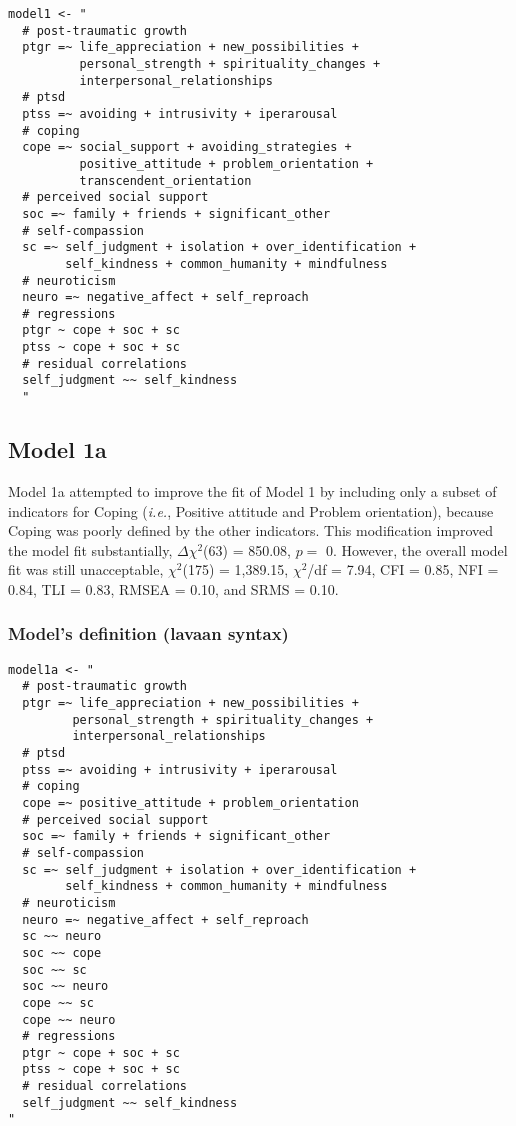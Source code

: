 \documentclass[aps,floatfix,prl]{revtex4}
\begin{document}
\begin{verbatim}
model1 <- "
  # post-traumatic growth
  ptgr =~ life_appreciation + new_possibilities + 
          personal_strength + spirituality_changes + 
          interpersonal_relationships
  # ptsd
  ptss =~ avoiding + intrusivity + iperarousal
  # coping
  cope =~ social_support + avoiding_strategies + 
          positive_attitude + problem_orientation + 
          transcendent_orientation
  # perceived social support
  soc =~ family + friends + significant_other
  # self-compassion
  sc =~ self_judgment + isolation + over_identification +
        self_kindness + common_humanity + mindfulness
  # neuroticism
  neuro =~ negative_affect + self_reproach
  # regressions
  ptgr ~ cope + soc + sc 
  ptss ~ cope + soc + sc 
  # residual correlations
  self_judgment ~~ self_kindness
  "
\end{verbatim}

\newpage

\hypertarget{model-1a}{%
\subsection{Model 1a}\label{model-1a}}

Model 1a attempted to improve the fit of Model 1 by including only a
subset of indicators for Coping (\emph{i.e.}, Positive attitude and
Problem orientation), because Coping was poorly defined by the other
indicators. This modification improved the model fit substantially,
\(\Delta \chi^2\)(63) = 850.08, \(p =\) 0. However, the overall model
fit was still unacceptable, \(\chi^2\)(175) = 1,389.15, \(\chi^2\)/df =
7.94, CFI = 0.85, NFI = 0.84, TLI = 0.83, RMSEA = 0.10, and SRMS = 0.10.

\hypertarget{models-definition-lavaan-syntax-2}{%
\subsubsection{Model's definition (lavaan
syntax)}\label{models-definition-lavaan-syntax-2}}

\begin{verbatim}
model1a <- "
  # post-traumatic growth
  ptgr =~ life_appreciation + new_possibilities + 
         personal_strength + spirituality_changes + 
         interpersonal_relationships
  # ptsd
  ptss =~ avoiding + intrusivity + iperarousal
  # coping
  cope =~ positive_attitude + problem_orientation 
  # perceived social support
  soc =~ family + friends + significant_other
  # self-compassion
  sc =~ self_judgment + isolation + over_identification +
        self_kindness + common_humanity + mindfulness
  # neuroticism
  neuro =~ negative_affect + self_reproach
  sc ~~ neuro
  soc ~~ cope
  soc ~~ sc
  soc ~~ neuro
  cope ~~ sc
  cope ~~ neuro
  # regressions
  ptgr ~ cope + soc + sc 
  ptss ~ cope + soc + sc 
  # residual correlations
  self_judgment ~~ self_kindness
"
\end{verbatim}
\end{document}
